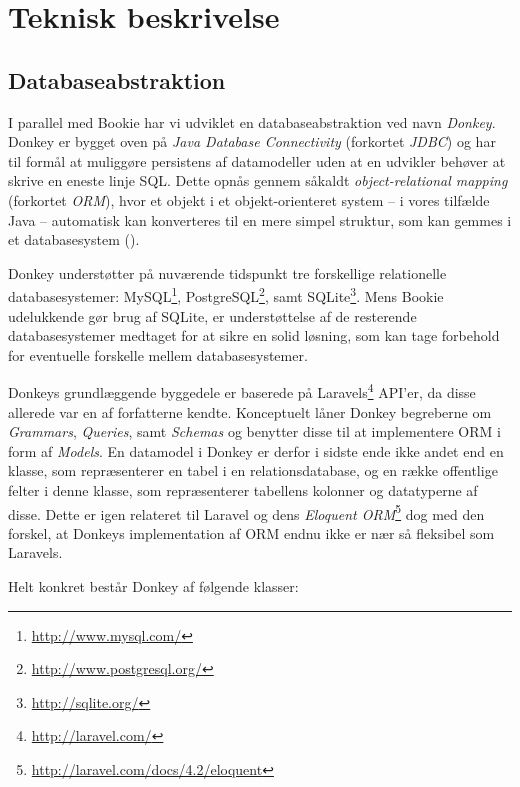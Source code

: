 \chapter{Teknisk beskrivelse}

\section{Databaseabstraktion}

I parallel med Bookie har vi udviklet en databaseabstraktion ved navn \textit{Donkey}. Donkey er bygget oven på \textit{Java Database Connectivity} (forkortet \textit{JDBC}) og har til formål at muliggøre persistens af datamodeller uden at en udvikler behøver at skrive en eneste linje SQL. Dette opnås gennem såkaldt \textit{object-relational mapping} (forkortet \textit{ORM}), hvor et objekt i et objekt-orienteret system – i vores tilfælde Java – automatisk kan konverteres til en mere simpel struktur, som kan gemmes i et databasesystem (\cite{wiki:orm}).

Donkey understøtter på nuværende tidspunkt tre forskellige relationelle databasesystemer: MySQL\footnote{\url{http://www.mysql.com/}}, PostgreSQL\footnote{\url{http://www.postgresql.org/}}, samt SQLite\footnote{\url{http://sqlite.org/}}. Mens Bookie udelukkende gør brug af SQLite, er understøttelse af de resterende databasesystemer medtaget for at sikre en solid løsning, som kan tage forbehold for eventuelle forskelle mellem databasesystemer.

Donkeys grundlæggende byggedele er baserede på Laravels\footnote{\url{http://laravel.com/}} API'er, da disse allerede var en af forfatterne kendte. Konceptuelt låner Donkey begreberne om \textit{Grammars}, \textit{Queries}, samt \textit{Schemas} og benytter disse til at implementere ORM i form af \textit{Models}. En datamodel i Donkey er derfor i sidste ende ikke andet end en klasse, som repræsenterer en tabel i en relationsdatabase, og en række offentlige felter i denne klasse, som repræsenterer tabellens kolonner og datatyperne af disse. Dette er igen relateret til Laravel og dens \textit{Eloquent ORM}\footnote{\url{http://laravel.com/docs/4.2/eloquent}} dog med den forskel, at Donkeys implementation af ORM endnu ikke er nær så fleksibel som Laravels.

Helt konkret består Donkey af følgende klasser:

